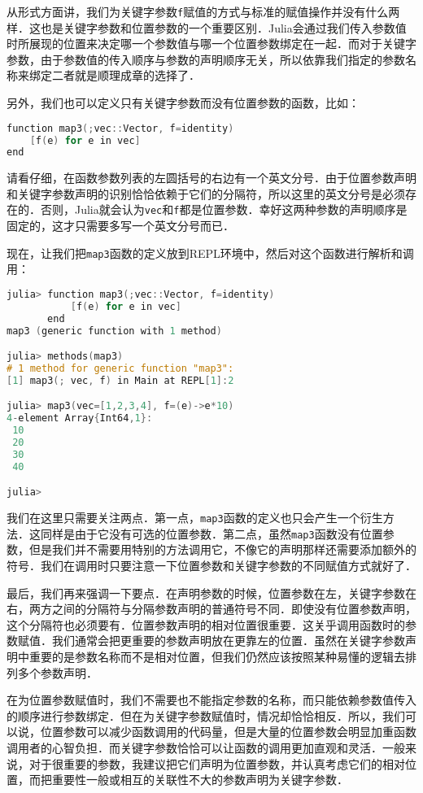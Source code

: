 从形式方面讲，我们为关键字参数\verb|f|赋值的方式与标准的赋值操作并没有什么两样．这也是关键字参数和位置参数的一个重要区别．Julia会通过我们传入参数值时所展现的位置来决定哪一个参数值与哪一个位置参数绑定在一起．而对于关键字参数，由于参数值的传入顺序与参数的声明顺序无关，所以依靠我们指定的参数名称来绑定二者就是顺理成章的选择了．

另外，我们也可以定义只有关键字参数而没有位置参数的函数，比如：

\begin{lstlisting}[language=cpp]
function map3(;vec::Vector, f=identity)
    [f(e) for e in vec]
end
\end{lstlisting}

请看仔细，在函数参数列表的左圆括号的右边有一个英文分号．由于位置参数声明和关键字参数声明的识别恰恰依赖于它们的分隔符，所以这里的英文分号是必须存在的．否则，Julia就会认为\verb|vec|和\verb|f|都是位置参数．幸好这两种参数的声明顺序是固定的，这才只需要多写一个英文分号而已．

现在，让我们把\verb|map3|函数的定义放到REPL环境中，然后对这个函数进行解析和调用：

\begin{lstlisting}[language=cpp]
julia> function map3(;vec::Vector, f=identity)
           [f(e) for e in vec]
       end
map3 (generic function with 1 method)

julia> methods(map3)
# 1 method for generic function "map3":
[1] map3(; vec, f) in Main at REPL[1]:2

julia> map3(vec=[1,2,3,4], f=(e)->e*10)
4-element Array{Int64,1}:
 10
 20
 30
 40

julia>
\end{lstlisting}

我们在这里只需要关注两点．第一点，\verb|map3|函数的定义也只会产生一个衍生方法．这同样是由于它没有可选的位置参数．第二点，虽然\verb|map3|函数没有位置参数，但是我们并不需要用特别的方法调用它，不像它的声明那样还需要添加额外的符号．我们在调用时只要注意一下位置参数和关键字参数的不同赋值方式就好了．

最后，我们再来强调一下要点．在声明参数的时候，位置参数在左，关键字参数在右，两方之间的分隔符与分隔参数声明的普通符号不同．即使没有位置参数声明，这个分隔符也必须要有．位置参数声明的相对位置很重要．这关乎调用函数时的参数赋值．我们通常会把更重要的参数声明放在更靠左的位置．虽然在关键字参数声明中重要的是参数名称而不是相对位置，但我们仍然应该按照某种易懂的逻辑去排列多个参数声明．

在为位置参数赋值时，我们不需要也不能指定参数的名称，而只能依赖参数值传入的顺序进行参数绑定．但在为关键字参数赋值时，情况却恰恰相反．所以，我们可以说，位置参数可以减少函数调用的代码量，但是大量的位置参数会明显加重函数调用者的心智负担．而关键字参数恰恰可以让函数的调用更加直观和灵活．一般来说，对于很重要的参数，我建议把它们声明为位置参数，并认真考虑它们的相对位置，而把重要性一般或相互的关联性不大的参数声明为关键字参数．

